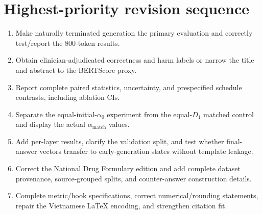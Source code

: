 \documentclass[11pt]{article}
\begin{document}
\section*{Highest-priority revision sequence}

\begin{enumerate}
    \item Make naturally terminated generation the primary evaluation and correctly test/report the 800-token results.
    \item Obtain clinician-adjudicated correctness and harm labels or narrow the title and abstract to the BERTScore proxy.
    \item Report complete paired statistics, uncertainty, and prespecified schedule contrasts, including ablation CIs.
    \item Separate the equal-initial-$\alpha_0$ experiment from the equal-$D_1$ matched control and display the actual $\alpha_{\mathrm{match}}$ values.
    \item Add per-layer results, clarify the validation split, and test whether final-answer vectors transfer to early-generation states without template leakage.
    \item Correct the National Drug Formulary edition and add complete dataset provenance, source-grouped splits, and counter-answer construction details.
    \item Complete metric/hook specifications, correct numerical/rounding statements, repair the Vietnamese LaTeX encoding, and strengthen citation fit.
\end{enumerate}
\end{document}
